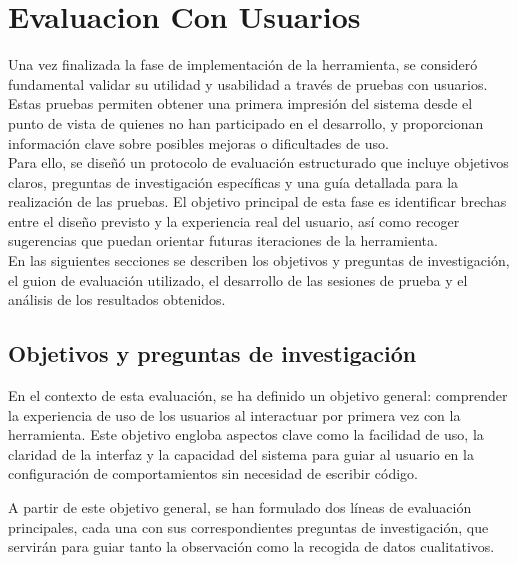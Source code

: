 \setcounter{secnumdepth}{3} %
\chapter{Evaluacion Con Usuarios}
\label{cap:evaluacionConUsuarios}



Una vez finalizada la fase de implementación de la herramienta, se consideró fundamental validar su utilidad y usabilidad a través de pruebas con usuarios. Estas pruebas permiten obtener una primera impresión del sistema desde el punto de vista de quienes no han participado en el desarrollo, y proporcionan información clave sobre posibles mejoras o dificultades de uso.\\

Para ello, se diseñó un protocolo de evaluación estructurado que incluye objetivos claros, preguntas de investigación específicas y una guía detallada para la realización de las pruebas. El objetivo principal de esta fase es identificar brechas entre el diseño previsto y la experiencia real del usuario, así como recoger sugerencias que puedan orientar futuras iteraciones de la herramienta.\\

En las siguientes secciones se describen los objetivos y preguntas de investigación, el guion de evaluación utilizado, el desarrollo de las sesiones de prueba y el análisis de los resultados obtenidos.\\

\section{Objetivos y preguntas de investigación} \label{sec:preguntas}

En el contexto de esta evaluación, se ha definido un objetivo general: comprender la experiencia de uso de los usuarios al interactuar por primera vez con la herramienta. Este objetivo engloba aspectos clave como la facilidad de uso, la claridad de la interfaz y la capacidad del sistema para guiar al usuario en la configuración de comportamientos sin necesidad de escribir código.

A partir de este objetivo general, se han formulado dos líneas de evaluación principales, cada una con sus correspondientes preguntas de investigación, que servirán para guiar tanto la observación como la recogida de datos cualitativos.

